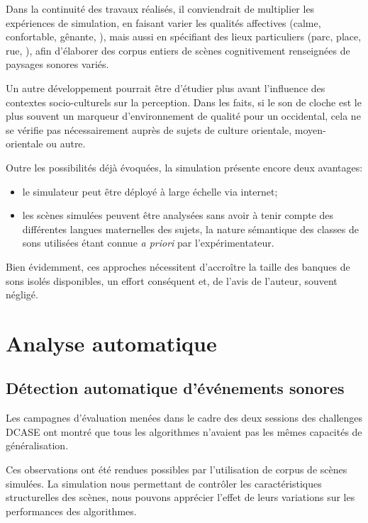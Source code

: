 Dans la continuité des travaux réalisés, il conviendrait de multiplier les expériences de simulation, en faisant varier les qualités affectives (calme, confortable, gênante, \etc), mais aussi en spécifiant des lieux particuliers (parc, place, rue, \etc), afin d'élaborer des corpus entiers de scènes cognitivement renseignées de paysages sonores variés.

Un autre développement pourrait être d'étudier plus avant l'influence des contextes socio-culturels sur la perception. Dans les faits, si le son de cloche est le plus souvent un marqueur d'environnement de qualité pour un occidental, cela ne se vérifie pas nécessairement auprès de sujets de culture orientale, moyen-orientale ou autre. 

Outre les possibilités déjà évoquées, la simulation présente encore deux avantages:

\begin{itemize}
\item le simulateur peut être déployé à large échelle via internet;
\item les scènes simulées peuvent être analysées sans avoir à tenir compte des différentes langues maternelles des sujets, la nature sémantique des classes de sons utilisées étant connue \emph{a priori} par l'expérimentateur.
\end{itemize}

Bien évidemment, ces approches nécessitent d'accroître la taille des banques de sons isolés disponibles, un effort conséquent et, de l'avis de l'auteur, souvent négligé.

\section{Analyse automatique}

\subsection{Détection automatique d'événements sonores}

Les campagnes d'évaluation menées dans le cadre des deux sessions des challenges DCASE ont montré que tous les algorithmes n'avaient pas les mêmes capacités de généralisation.

Ces observations ont été rendues possibles par l'utilisation de corpus de scènes simulées. La simulation nous permettant de contrôler les caractéristiques structurelles des scènes, nous pouvons apprécier l’effet de leurs variations sur les performances des algorithmes.


